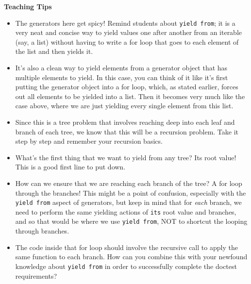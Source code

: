 \begin{blocksection}
\begin{guide}
\textbf{Teaching Tips}
\begin{itemize}
\item The generators here get spicy! Remind students about \texttt{yield from}; it is a very neat and concise way to yield values one after another from an iterable (say, a list) without having to write a for loop that goes to each element of the list and then yields it.
\item It's also a clean way to yield elements from a generator object that has multiple elements to yield. In this case, you can think of it like it's first putting the generator object into a for loop, which, as stated earlier, forces out all elements to be yielded into a list. Then it becomes very much like the case above, where we are just yielding every single element from this list.
\item Since this is a tree problem that involves reaching deep into each leaf and branch of each tree, we know that this will be a recursion problem. Take it step by step and remember your recursion basics.
\item What's the first thing that we want to yield from any tree? Its root value! This is a good first line to put down.
\item How can we ensure that we are reaching each branch of the tree? A for loop through the branches! This might be a point of confusion, especially with the \texttt{yield from} aspect of generators, but keep in mind that for \textit{each} branch, we need to perform the same yielding actions of \texttt{its} root value and branches, and so that would be where we use \texttt{yield from}, NOT to shortcut the looping through branches.
\item The code inside that for loop should involve the recursive call to apply the same function to each branch. How can you combine this with your newfound knowledge about \texttt{yield from} in order to successfully complete the doctest requirements?
\end{itemize}
\end{guide}
\end{blocksection}
